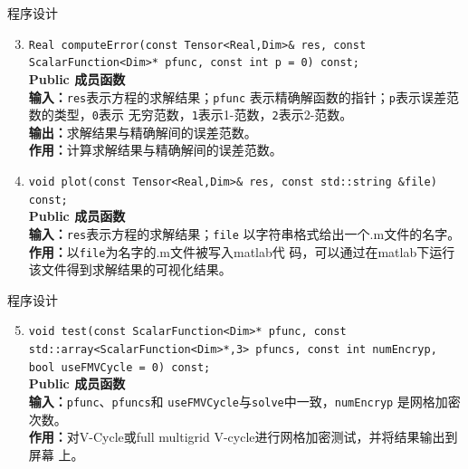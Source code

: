 \documentclass{beamer}
\begin{document}
      \begin{frame}{程序设计}
  \begin{enumerate}[(1)] \setcounter{enumi}{2}
                                     \item \texttt{Real
                                         computeError(const
                                         Tensor<Real,Dim>\& res, const
                                         ScalarFunction<Dim>* pfunc, const int p = 0) const;}\\
          \textbf{Public 成员函数}\\
          \textbf{输入：}\texttt{res}表示方程的求解结果；\texttt{pfunc}
          表示精确解函数的指针；\texttt{p}表示误差范数的类型，\texttt{0}表示
          无穷范数，\texttt{1}表示1-范数，\texttt{2}表示2-范数。\\
          \textbf{输出：}求解结果与精确解间的误差范数。\\
          \textbf{作用：}计算求解结果与精确解间的误差范数。
          \item \texttt{void plot(const Tensor<Real,Dim>\& res, const
              std::string \&file) const;}\\
          \textbf{Public 成员函数}\\
          \textbf{输入：}\texttt{res}表示方程的求解结果；\texttt{file}
          以字符串格式给出一个$.$m文件的名字。\\
          \textbf{作用：}以\texttt{file}为名字的$.$m文件被写入matlab代
          码，可以通过在matlab下运行该文件得到求解结果的可视化结果。
        \end{enumerate}

      \end{frame}
      \begin{frame}{程序设计}
  \begin{enumerate}[(1)] \setcounter{enumi}{4}
                            \item \texttt{void test(const ScalarFunction<Dim>* pfunc,
            const std::array<ScalarFunction<Dim>*,3> pfuncs, const int
            numEncryp, bool useFMVCycle = 0) const;}\\
          \textbf{Public 成员函数}\\
          \textbf{输入：}\texttt{pfunc}、\texttt{pfuncs}和
          \texttt{useFMVCycle}与\texttt{solve}中一致，\texttt{numEncryp} 是网格加密次数。\\
          \textbf{作用：}对V-Cycle或full multigrid V-cycle进行网格加密测试，并将结果输出到屏幕
          上。
        \end{enumerate}

      \end{frame}
\end{document}
